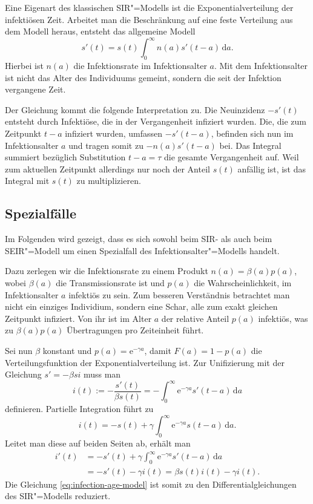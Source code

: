 \documentclass[a4paper,10pt,fleqn,twocolumn,twoside,dvipdfmx]{scrartcl}
\numberwithin{equation}{section}
\newcommand{\ee}{\mathrm e}
\begin{document}
Eine Eigenart des klassischen SIR"=Modells ist die
Exponentialverteilung der infektiösen Zeit. Arbeitet man die Beschränkung
auf eine feste Verteilung aus dem Modell heraus, entsteht das
allgemeine Modell
\begin{equation}\label{eq:infection-age-model}
s'(t) = s(t)\int_0^\infty n(a)s'(t-a)\,\mathrm da.
\end{equation}
Hierbei ist $n(a)$ die Infektionsrate im Infektionsalter $a$. Mit
dem Infektionsalter ist nicht das Alter des Individuums gemeint,
sondern die seit der Infektion vergangene Zeit.

Der Gleichung kommt die folgende Interpretation zu. Die Neuinzidenz $-s'(t)$
entsteht durch Infektiöse, die in der Vergangenheit infiziert wurden.
Die, die zum Zeitpunkt $t-a$ infiziert wurden, umfassen $-s'(t-a)$,
befinden sich nun im Infektionsalter $a$ und tragen somit zu
$-n(a)s'(t-a)$ bei. Das Integral summiert bezüglich Substitution
$t-a=\tau$ die gesamte Vergangenheit auf. Weil zum aktuellen Zeitpunkt
allerdings nur noch der Anteil $s(t)$ anfällig ist, ist das Integral
mit $s(t)$ zu multiplizieren.


\subsection{Spezialfälle}

Im Folgenden wird gezeigt, dass es sich sowohl beim SIR- als auch beim
SEIR"=Modell um einen Spezialfall des Infektionsalter"=Modells handelt.

Dazu zerlegen wir die Infektionsrate zu einem Produkt
$n(a)=\beta(a)p(a)$, wobei $\beta(a)$ die Transmissionsrate ist
und $p(a)$ die Wahrscheinlichkeit, im Infektionsalter $a$
infektiös zu sein. Zum besseren Verständnis betrachtet man nicht
ein einziges Individium, sondern eine Schar, alle zum exakt gleichen
Zeitpunkt infiziert. Von ihr ist im Alter $a$ der relative Anteil
$p(a)$ infektiös, was zu $\beta(a)p(a)$ Übertragungen pro Zeiteinheit
führt.

Sei nun $\beta$ konstant und $p(a)=\ee^{-\gamma a}$, damit
$F(a)=1-p(a)$ die Verteilungsfunktion der Exponentialverteilung ist.
Zur Unifizierung mit der Gleichung $s' = -\beta si$ muss man
\[i(t) := -\frac{s'(t)}{\beta s(t)}
= -\int_0^\infty\ee^{-\gamma a} s'(t-a)\,\mathrm da\]
definieren. Partielle Integration führt zu
\[i(t) = -s(t) + \gamma\int_0^\infty \ee^{-\gamma a}s(t-a)\,\mathrm da.\]
Leitet man diese auf beiden Seiten ab, erhält man
\begin{align*}
i'(t) &= -s'(t) +\gamma\int_0^\infty \ee^{-\gamma a}s'(t-a)\,\mathrm da\\
&= -s'(t) - \gamma i(t) = \beta s(t)i(t) - \gamma i(t).
\end{align*}
Die Gleichung \eqref{eq:infection-age-model} ist somit zu den 
Differentialgleichungen des SIR"=Modells reduziert.
\end{document}
